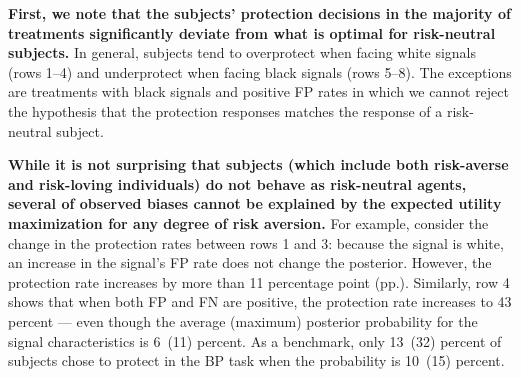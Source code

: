 \documentclass[12pt,a4paper]{article}
\begin{document}
\textbf{First, we note that the subjects' protection decisions in the majority of treatments significantly deviate from what is optimal for risk-neutral subjects.}  In general, subjects tend to overprotect when facing white signals (rows 1--4) and underprotect when facing black signals (rows 5--8). The exceptions are treatments with black signals and positive FP rates in which we cannot reject the hypothesis that the protection responses matches the response of a risk-neutral subject. 

\textbf{While it is not surprising that subjects (which include both risk-averse and risk-loving individuals) do not behave as risk-neutral agents, several of observed biases cannot be explained by the expected utility maximization for any degree of risk aversion.} For example, consider the change in the protection rates between rows 1 and 3: because the signal is white, an increase in the signal's FP rate does not change the posterior. However, the protection rate increases by more than 11 percentage point (pp.). Similarly, row 4 shows that when both FP and FN are positive, the protection rate increases to 43 percent --- even though the average (maximum) posterior probability for the signal characteristics is 6~(11) percent. As a benchmark, only 13~(32) percent of subjects chose to protect in the BP task when the probability is 10~(15) percent. 


\begin{table}[H]\centering 
\caption{Average Protection by Signal Type} 
\label{tab:nonparIP}
\end{table}
\end{document}
